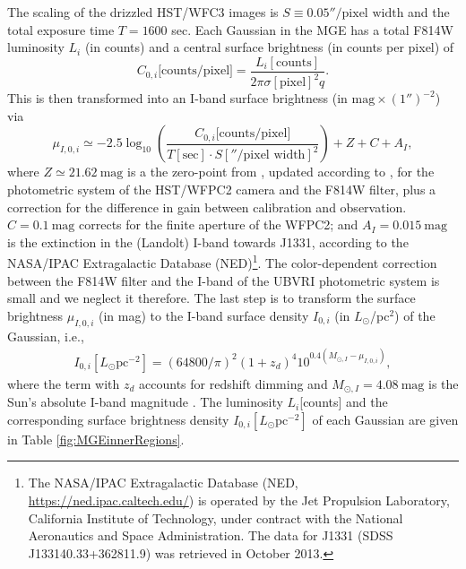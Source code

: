 \documentclass[useAMS,usenatbib]{mnras}
\begin{document}
The scaling of the drizzled HST/WFC3 images is  $S \equiv 0.05''/\text{pixel width}$ and the total exposure time $T = 1600$ sec. Each Gaussian in the MGE has a total F814W luminosity $L_i$ (in counts) and a central surface brightness (in counts per pixel) of
\begin{equation*}
C_{0,i}\text{[counts/pixel]} = \frac{L_i[\text{counts}]}{2\pi \sigma[\text{pixel}]^2 q}.
\end{equation*}
This is then transformed into an I-band surface brightness (in $\text{mag}\times(1'')^{-2}$) via
\begin{equation}
\mu_{I,0,i} \simeq -2.5 \log_{10}\left( \frac{C_{0,i}\text{[counts/pixel]}}{T[\text{sec}] \cdot S[''/\text{pixel width}]^2}\right) + Z + C + A_I, \label{eq:muI_}
\end{equation}
where $Z\simeq21.62~\text{mag}$ is a the zero-point from \citet{Holtzman}, updated according to \citet{Dolphin,DolphinNew}, for the photometric system of the HST/WFPC2 camera and the F814W filter, plus a correction for the difference in gain between calibration and observation. $C= 0.1~\text{mag}$ corrects for the finite aperture of the WFPC2; and $A_I =0.015~\text{mag}$ is the extinction in the (Landolt) I-band towards J1331, according to the NASA/IPAC Extragalactic Database (NED)\footnote{The NASA/IPAC Extragalactic Database (NED, \url{https://ned.ipac.caltech.edu/}) is operated by the Jet Propulsion Laboratory, California Institute of Technology, under contract with the National Aeronautics and Space Administration. The data for J1331 (SDSS J133140.33+362811.9) was retrieved in October 2013.}. The color-dependent correction between the F814W filter and the I-band of the UBVRI photometric system is  small \citep{Holtzman} and we neglect it therefore. The last step is to transform the surface brightness $\mu_{I,0,i}$ (in mag) to the I-band surface density $I_{0,i}$ (in $L_\odot$/pc$^2$) of the Gaussian, i.e.,
\begin{eqnarray*}
I_{0,i}[L_\odot \text{pc}^{-2}] = \left( 64800/\pi\right)^2 \left(1+z_d \right)^4 10^{0.4\left(M_{\odot,I}-\mu_{I,0,i} \right)},
\end{eqnarray*}
where the term with $z_d$ accounts for redshift dimming and $M_{\odot,I}=4.08~\text{mag}$ is the Sun's absolute I-band magnitude \citep{1998gaas.book.....B}. The luminosity $L_i$[counts] and the corresponding surface brightness density $I_{0,i} [L_\odot \text{pc}^{-2}]$ of each Gaussian are given in Table \ref{fig:MGEinnerRegions}.

\end{document}

